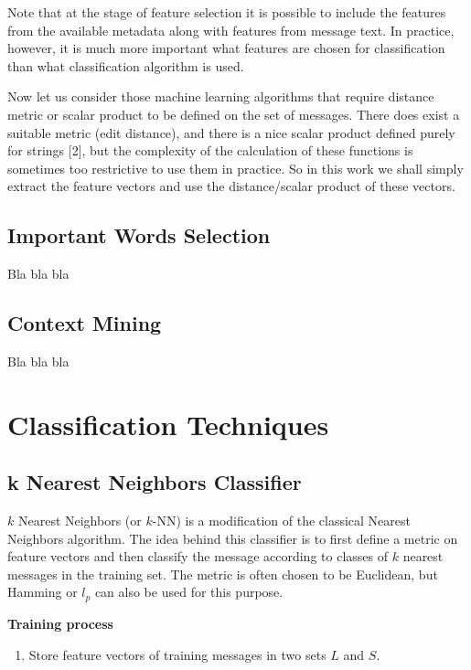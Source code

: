 \documentclass[12pt]{report}
\begin{document}
Note that at the stage of feature selection it is possible to include the features from the available metadata along with features from message text. In practice, however, it is much more important what features are chosen for classification than what classification algorithm is used.

Now let us consider those machine learning algorithms that require distance metric or scalar product to be defined on the set of messages. There does exist a suitable metric (edit distance), and there is a nice scalar product defined purely for strings [2], but the complexity of the calculation of these functions is sometimes too restrictive to use them in practice. So in this work we shall simply extract the feature vectors and use the distance/scalar product of these vectors.

\newpage

\section{Important Words Selection}

Bla bla bla

\newpage

\section{Context Mining}

Bla bla bla

\newpage

\chapter{Classification Techniques}

\section{k Nearest Neighbors Classifier}

$k$ Nearest Neighbors (or $k$-NN) is a modification of the classical Nearest Neighbors algorithm. The idea behind this classifier is to first define a metric on feature vectors and then classify the message according to classes of $k$ nearest messages in the training set. The metric is often chosen to be Euclidean, but Hamming or $l_p$ can also be used for this purpose.

\textbf{Training process}

\begin{enumerate}
        \item Store feature vectors of training messages in two sets $L$ and $S$.
\end{enumerate}
\end{document}
